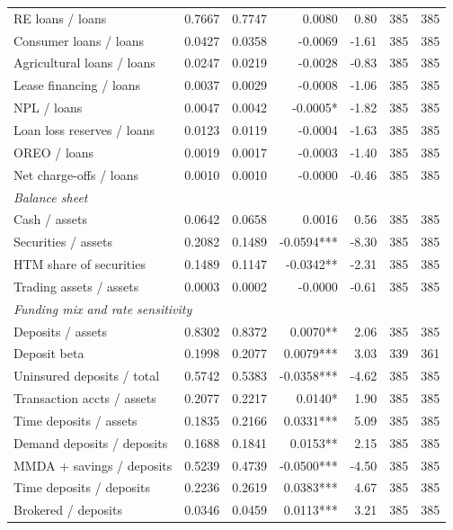 \begin{tabular}{lrrrrrr}
RE loans / loans & 0.7667 & 0.7747 & 0.0080 & 0.80 & 385 & 385 \\
Consumer loans / loans & 0.0427 & 0.0358 & -0.0069 & -1.61 & 385 & 385 \\
Agricultural loans / loans & 0.0247 & 0.0219 & -0.0028 & -0.83 & 385 & 385 \\
Lease financing / loans & 0.0037 & 0.0029 & -0.0008 & -1.06 & 385 & 385 \\
NPL / loans & 0.0047 & 0.0042 & -0.0005* & -1.82 & 385 & 385 \\
Loan loss reserves / loans & 0.0123 & 0.0119 & -0.0004 & -1.63 & 385 & 385 \\
OREO / loans & 0.0019 & 0.0017 & -0.0003 & -1.40 & 385 & 385 \\
Net charge-offs / loans & 0.0010 & 0.0010 & -0.0000 & -0.46 & 385 & 385 \\
\midrule
\multicolumn{7}{l}{\emph{Balance sheet}} \\
\midrule
Cash / assets & 0.0642 & 0.0658 & 0.0016 & 0.56 & 385 & 385 \\
Securities / assets & 0.2082 & 0.1489 & -0.0594*** & -8.30 & 385 & 385 \\
HTM share of securities & 0.1489 & 0.1147 & -0.0342** & -2.31 & 385 & 385 \\
Trading assets / assets & 0.0003 & 0.0002 & -0.0000 & -0.61 & 385 & 385 \\
\midrule
\multicolumn{7}{l}{\emph{Funding mix and rate sensitivity}} \\
\midrule
Deposits / assets & 0.8302 & 0.8372 & 0.0070** & 2.06 & 385 & 385 \\
Deposit beta & 0.1998 & 0.2077 & 0.0079*** & 3.03 & 339 & 361 \\
Uninsured deposits / total & 0.5742 & 0.5383 & -0.0358*** & -4.62 & 385 & 385 \\
Transaction accts / assets & 0.2077 & 0.2217 & 0.0140* & 1.90 & 385 & 385 \\
Time deposits / assets & 0.1835 & 0.2166 & 0.0331*** & 5.09 & 385 & 385 \\
Demand deposits / deposits & 0.1688 & 0.1841 & 0.0153** & 2.15 & 385 & 385 \\
MMDA + savings / deposits & 0.5239 & 0.4739 & -0.0500*** & -4.50 & 385 & 385 \\
Time deposits / deposits & 0.2236 & 0.2619 & 0.0383*** & 4.67 & 385 & 385 \\
Brokered / deposits & 0.0346 & 0.0459 & 0.0113*** & 3.21 & 385 & 385 \\

\end{tabular}
